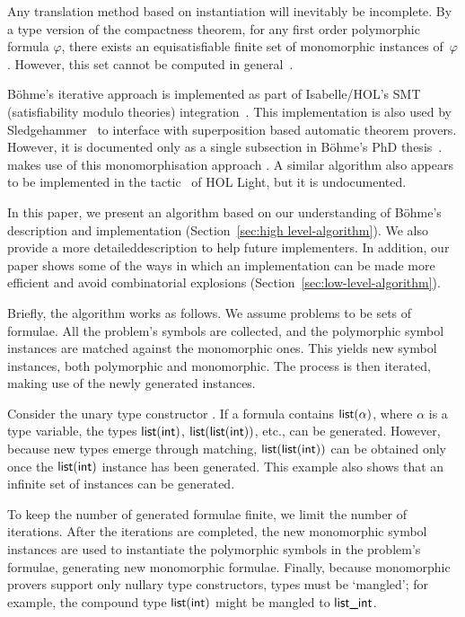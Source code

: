 \documentclass[runningheads]{llncs}
\begin{document}
Any translation method based on instantiation will inevitably be incomplete.
By a type version of the compactness theorem, for any first order polymorphic formula \(\varphi\), there exists an equisatisfiable finite set of monomorphic instances of~\(\varphi\). However, this set cannot be computed in general~\cite[Theorem~1]{expr-poly-types}.

B\"ohme's iterative approach is implemented as part of Isabelle/HOL's SMT (satisfiability modulo theories) integration~\cite[Chapter 2]{sb-phd}. This implementation is also used by Sledgehammer~\cite{judgement,paulson-blanchette-2010} to interface with superposition based automatic theorem provers. However, it is documented only as a single subsection in B\"ohme's PhD thesis~\cite[Section 2.2.1]{sb-phd}.
 makes use of this monomorphisation approach \cite{smt-lib-mono}.
A similar algorithm also appears to be implemented in the  tactic~\cite{harrison-1996} of HOL Light, but it is undocumented.

In this paper, we present an algorithm based on our understanding of Böhme's description and implementation (Section~\ref{sec:high level-algorithm}). We also provide a more detailed\pagebreak[2] \hbox{description} to help future implementers. In addition, our paper shows some of the ways in which an implementation can be made more efficient and avoid combinatorial explosions (Section~\ref{sec:low-level-algorithm}).

Briefly, the algorithm works as follows. We assume problems to be sets of formulae. All the problem's symbols are collected, and the polymorphic symbol instances are matched against the monomorphic ones. This yields new symbol instances, both polymorphic and monomorphic. The process is then iterated, making use of the newly generated instances.

Consider the unary type constructor . If a formula contains $\textsf{list}(\alpha)$, where $\alpha$ is a type variable, the types $\textsf{list}(\textsf{int})$, $\textsf{list}(\textsf{list}(\textsf{int}))$, etc., can be generated. However, because new types emerge through matching, $\textsf{list}(\textsf{list}(\textsf{int}))$ can be obtained only once the $\textsf{list}(\textsf{int})$ instance has been generated.
This example also shows that an infinite set of instances can be generated.

To keep the number of generated formulae finite, we limit the number of iterations. After the iterations are completed, the new monomorphic symbol instances are used to instantiate the polymorphic symbols in the problem's formulae, generating new monomorphic formulae. Finally, because monomorphic provers support only nullary type constructors, types must be `mangled'; for example, the compound type $\textsf{list}(\textsf{int})$ might be mangled to $\textsf{list\_int}$.
\end{document}
